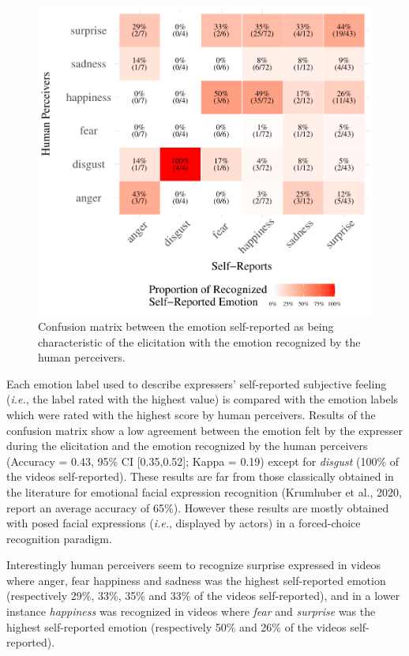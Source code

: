 \documentclass[
  english,
  man]{apa7}
\begin{document}
\begin{figure}[!h]
\includegraphics[width=\textwidth]{manuscript_apa_files/figure-latex/confusionMatrix-sr-hr-1} \caption{Confusion matrix between the emotion self-reported as being characteristic of the elicitation with the emotion recognized by the human perceivers.}\label{fig:confusionMatrix-sr-hr}
\end{figure}

Each emotion label used to describe expressers' self-reported subjective feeling (\emph{i.e.}, the label rated with the highest value) is compared with the emotion labels which were rated with the highest score by human perceivers. Results of the confusion matrix show a low agreement between the emotion felt by the expresser during the elicitation and the emotion recognized by the human perceivers (Accuracy = 0.43, 95\% CI {[}0.35,0.52{]}; Kappa = 0.19) except for \emph{disgust} (100\% of the videos self-reported). These results are far from those classically obtained in the literature for emotional facial expression recognition (Krumhuber et al., 2020, report an average accuracy of 65\%). However these results are mostly obtained with posed facial expressions (\emph{i.e.}, displayed by actors) in a forced-choice recognition paradigm.

Interestingly human perceivers seem to recognize surprise expressed in videos where anger, fear happiness and sadness was the highest self-reported emotion (respectively 29\%, 33\%, 35\% and 33\% of the videos self-reported), and in a lower instance \emph{happiness} was recognized in videos where \emph{fear} and \emph{surprise} was the highest self-reported emotion (respectively 50\% and 26\% of the videos self-reported).
\end{document}
